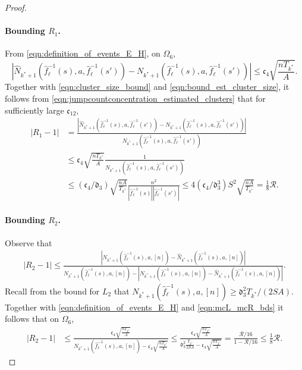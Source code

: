\documentclass[11pt]{article}
\newcommand{\mf}[1]{\mathfrak{#1}}
\newcommand{\mcR}{\mathcal{R}}
\theoremstyle{definition}
\theoremstyle{definition}
\begin{document}
\begin{proof}
	\paragraph{Bounding $R_1$.}
	From \eqref{eqn:definition_of_events_E_H}, on $\Omega_6$,
	\begin{equation}
		\label{eqn:jumpcountconcentration_estimated_clusters}
		|
		\hat{N}_{k^*+1}(\hat{f}_{\ell}^{-1}(s),a,\hat{f}_{\ell}^{-1}(s'))
		-
		N_{k^*+1}(\hat{f}_{\ell}^{-1}(s),a,\hat{f}_{\ell}^{-1}(s'))
		|
		\leq
		\mf{c}_4
		\sqrt{\frac{nT_{k^*}}{A}}.
	\end{equation}
	Together with \eqref{eqn:cluster_size_bound} and \eqref{eqn:bound_est_cluster_size}, it follows from \eqref{eqn:jumpcountconcentration_estimated_clusters} that for sufficiently large $\mf{c}_{12}$,
	\begin{equation}
		\begin{split}
			\left|R_1-1\right|
			 &
			=
			\frac{|\hat{N}_{k^*+1}(\hat{f}_{\ell}^{-1}(s),a,\hat{f}_{\ell}^{-1}(s'))- N_{k^*+1}(\hat{f}_{\ell}^{-1}(s),a,\hat{f}_{\ell}^{-1}(s'))|}{N_{k^*+1}(\hat{f}_{\ell}^{-1}(s),a,\hat{f}_{\ell}^{-1}(s'))}
			\\
			 &
			\leq
			\mf{c}_4\sqrt{\frac{nT_{k^*}}{A}}
			\frac{1}{N_{k^*+1}(\hat{f}_{\ell}^{-1}(s),a,\hat{f}_{\ell}^{-1}(s'))}
			\\
			 &
			\leq
			(\mf{c}_4/\mf{d}_3)\sqrt{\frac{nA}{T_{k^*}}}\frac{n^2}{|\hat{f}_{\ell}^{-1}(s)||\hat{f}_{\ell}^{-1}(s')|}
			\leq
			4(\mf{c}_4/\mf{d}_3^3)S^2\sqrt{\frac{nA}{T_{k^*}}}
			=
			\frac{1}{8}
			\mcR
			.
		\end{split}
	\end{equation}
	\paragraph{Bounding $R_2$.} Observe that
	\begin{equation}
		\begin{split}
			|R_2-1|
			\leq
			\frac{|N_{k^*+1}(\hat{f}_{\ell}^{-1}(s),a,[n])-\hat{N}_{k^*+1}(\hat{f}_{\ell}^{-1}(s),a,[n])|}{N_{k^*+1}(\hat{f}_{\ell}^{-1}(s),a,[n])-|N_{k^*+1}(\hat{f}_{\ell}^{-1}(s),a,[n])-\hat{N}_{k^*+1}(\hat{f}_{\ell}^{-1}(s),a,[n])|}
			.
		\end{split}
	\end{equation}
	Recall from the bound for $L_2$ that $N_{k^*+1}(\hat{f}_{\ell}^{-1}(s),a,[n])\geq \mf{d}_3^2 T_{k^*}/(2SA)$.
	Together with \eqref{eqn:definition_of_events_E_H} and \eqref{eqn:mcL_mcR_bds} it follows that on $\Omega_6$,
	\begin{equation}
		\begin{split}
			|R_2-1|
			 &
			\leq
			\frac{\mf{c}_4\sqrt{\frac{nT_{k^*}}{A}}}{N_{k^*+1}(\hat{f}_{\ell}^{-1}(s),a,[n])-\mf{c}_4\sqrt{\frac{nT_{k^*}}{A}}}
			\leq
			\frac{\mf{c}_4\sqrt{\frac{nT_{k^*}}{A}}}{\mf{d}_3^2\frac{T_{k^*}}{2SA}-\mf{c}_4\sqrt{\frac{nT_{k^*}}{A}}}
			=
			\frac{\mcR/16}{1-\mcR/16}
			\leq
			\frac{1}{8}
			\mcR
			.
		\end{split}
	\end{equation}


\end{proof}
\end{document}
